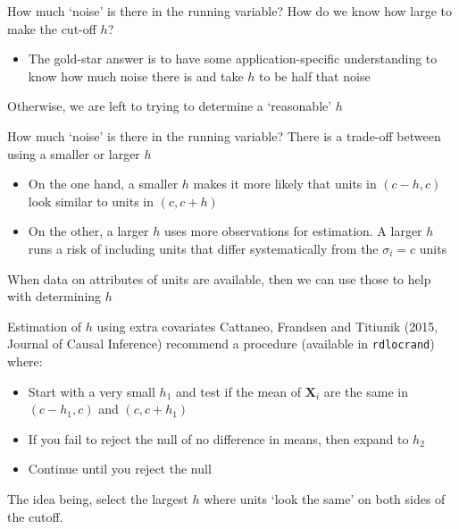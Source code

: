 \documentclass[aspectratio=169,t,11pt,table]{beamer}
\begin{document}
\begin{frame}{How much `noise' is there in the running variable?}{}
  How do we know how large to make the cut-off $h$? 
  \begin{itemize}
    \item The gold-star answer is to have some application-specific understanding to know how much noise there is and take $h$ to be half that noise
  \end{itemize}

  \bigskip
  Otherwise, we are left to trying to determine a `reasonable' $h$
\end{frame}

\begin{frame}{How much `noise' is there in the running variable?}{}
  There is a trade-off between using a smaller or larger $h$
  \begin{itemize}
    \item On the one hand, a smaller $h$ makes it more likely that units in $(c-h, c)$ look similar to units in $(c, c+h)$
    
    \item On the other, a larger $h$ uses more observations for estimation. A larger $h$ runs a risk of including units that differ systematically from the $\sigma_i = c$ units
  \end{itemize}

  When data on attributes of units are available, then we can use those to help with determining $h$
\end{frame}

\begin{frame}{Estimation of $h$ using extra covariates}{}
  Cattaneo, Frandsen and Titiunik (2015, Journal of Causal Inference) recommend a procedure (available in \texttt{rdlocrand}) where:
  \begin{itemize}
    \item Start with a very small $h_1$ and test if the mean of $\bm{X}_i$ are the same in $(c - h_1, c)$ and $(c, c + h_1)$
    
    \item If you fail to reject the null of no difference in means, then expand to $h_2$
    
    \item Continue until you reject the null
  \end{itemize}

  \bigskip
  The idea being, select the largest $h$ where units `look the same' on both sides of the cutoff.
\end{frame}
\end{document}
